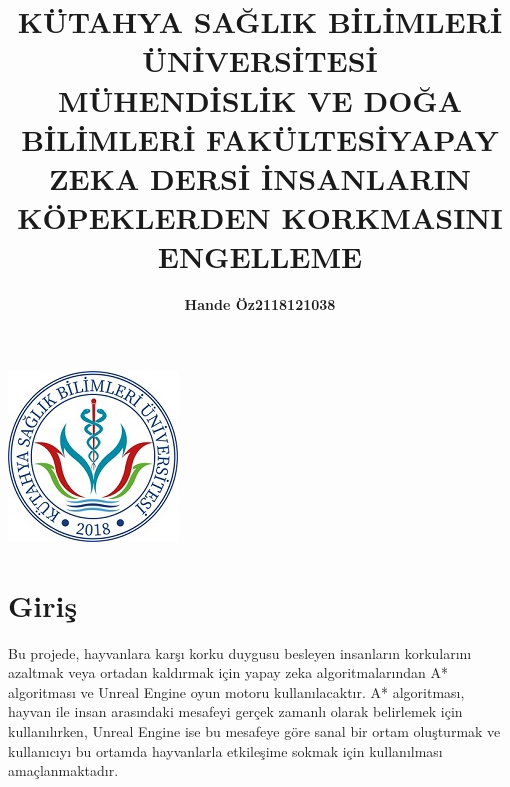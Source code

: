 \documentclass[12pt,a4paper]{article}
\title{\bf\fontsize{12pt}{14pt}\selectfont KÜTAHYA SAĞLIK BİLİMLERİ ÜNİVERSİTESİ \\ MÜHENDİSLİK VE DOĞA BİLİMLERİ FAKÜLTESİ}
\begin{document}
	\maketitle
	\thispagestyle{empty}
	\begin{center}
		\includegraphics{images/ksbu.png}
	\end{center}
	\begin{center}
		\vspace{1cm} %
	\end{center}
	\begin{center}
		\title{\bf\fontsize{12pt}{14pt}\selectfont YAPAY ZEKA DERSİ }
	\end{center}
	\begin{center}
		\title{\bf\fontsize{12pt}{14pt}\selectfont İNSANLARIN KÖPEKLERDEN KORKMASINI ENGELLEME}
	\end{center}
	\begin{center}
		\vspace{1cm} %
	\end{center}
	\begin{center}
		
		\author{\bf\fontsize{12pt}{14pt}Hande Öz\hspace{1.5cm}2118121038}
		
		\begin{center}
			\vspace{1cm} %
		\end{center}
		\begin{center}
			\vspace{1cm} %
		\end{center}
	\end{center}
	
	\section{Giriş} 
		Bu projede, hayvanlara karşı korku duygusu besleyen insanların korkularını azaltmak veya ortadan kaldırmak için yapay zeka algoritmalarından A* algoritması ve Unreal Engine oyun motoru kullanılacaktır. A* algoritması, hayvan ile insan arasındaki mesafeyi gerçek zamanlı olarak belirlemek için kullanılırken, Unreal Engine ise bu mesafeye göre sanal bir ortam oluşturmak ve kullanıcıyı bu ortamda hayvanlarla etkileşime sokmak için kullanılması amaçlanmaktadır.
		
\end{document}
